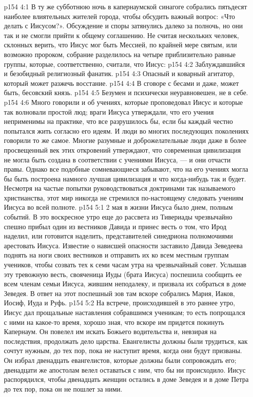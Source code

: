 \vs p154 4:1 В ту же субботнюю ночь в капернаумской синагоге собрались пятьдесят наиболее влиятельных жителей города, чтобы обсудить важный вопрос: «Что делать с Иисусом?». Обсуждение и споры затянулись далеко за полночь, но они так и не смогли прийти к общему соглашению. Не считая нескольких человек, склонных верить, что Иисус мог быть Мессией, по крайней мере святым, или возможно пророком, собрание разделилось на четыре приблизительно равные группы, которые, соответственно, считали, что Иисус:
\vs p154 4:2 \bibnobreakspace Заблуждавшийся и безобидный религиозный фанатик.
\vs p154 4:3 \bibnobreakspace Опасный и коварный агитатор, который может разжечь восстание.
\vs p154 4:4 \bibnobreakspace В сговоре с бесами и даже, может быть, бесовский князь.
\vs p154 4:5 \bibnobreakspace Безумен и психически неуравновешен, не в себе.
\vs p154 4:6 \pc Много говорили и об учениях, которые проповедовал Иисус и которые так волновали простой люд; враги Иисуса утверждали, что его учения неприменимы на практике, что все разрушилось бы, если бы каждый честно попытался жить согласно его идеям. И люди во многих последующих поколениях говорили то же самое. Многие разумные и доброжелательные люди даже в более просвещенный век этих откровений утверждают, что современная цивилизация не могла быть создана в соответствии с учениями Иисуса, --- и они отчасти правы. Однако все подобные сомневающиеся забывают, что на его учениях могла бы быть построена намного лучшая цивилизация и что когда\hyp{}нибудь так и будет. Несмотря на частые попытки руководствоваться доктринами так называемого христианства, этот мир никогда не стремился по\hyp{}настоящему следовать учениям Иисуса во всей полноте.
\vs p154 5:1 2 мая в жизни Иисуса было днем, полным событий. В это воскресное утро еще до рассвета из Тивериады чрезвычайно спешно прибыл один из вестников Давида и принес весть о том, что Ирод наделил, или готовится наделить, представителей синедриона полномочиями арестовать Иисуса. Известие о нависшей опасности заставило Давида Зеведеева поднять на ноги своих вестников и отправить их ко всем местным группам учеников, чтобы созвать тех к семи часам утра на чрезвычайный совет. Услышав эту тревожную весть, свояченица Иуды (брата Иисуса) поспешила сообщить ее всем членам семьи Иисуса, жившим неподалеку, и призвала их собраться в доме Зеведея. В ответ на этот поспешный зов там вскоре собрались Мария, Иаков, Иосиф, Иуда и Руфь.
\vs p154 5:2 На встрече, происходившей в это раннее утро, Иисус дал прощальные наставления собравшимся ученикам; то есть попрощался с ними на какое\hyp{}то время, хорошо зная, что вскоре им придется покинуть Капернаум. Он повелел им искать Божьего водительства и, невзирая на последствия, продолжать дело царства. Евангелисты должны были трудиться, как сочтут нужным, до тех пор, пока не наступит время, когда они будут призваны. Он избрал двенадцать евангелистов, которые должны были сопровождать его; двенадцати же апостолам велел оставаться с ним, что бы ни происходило. Иисус распорядился, чтобы двенадцать женщин остались в доме Зеведея и в доме Петра до тех пор, пока он не пошлет за ними.
